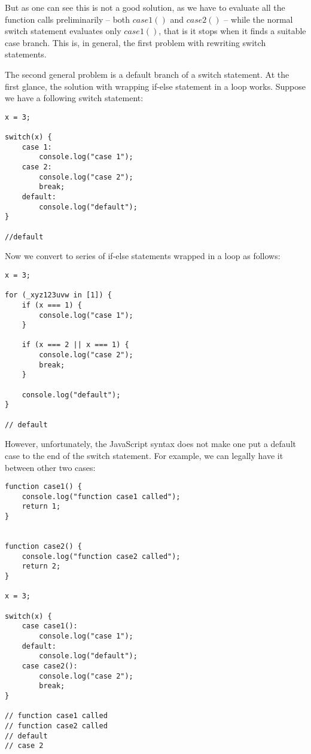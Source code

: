 \documentclass[a4paper]{article}
\begin{document}
But as one can see this is not a good solution, as we have to evaluate all the function calls preliminarily -- both $case1()$ and $case2()$ -- while the normal switch statement evaluates only $case1()$, that is it stops when it finds a suitable case branch. This is, in general, the first problem with rewriting switch statements.

The second general problem is a default branch of a switch statement. At the first glance, the solution with wrapping if-else statement in a loop works. Suppose we have a following switch statement:

\begin{lstlisting}
x = 3;

switch(x) {
    case 1: 
        console.log("case 1");
    case 2:
        console.log("case 2");	
        break;
    default: 
        console.log("default");
}

//default
\end{lstlisting} 

 Now we convert to series of if-else statements wrapped in a loop as follows:
 
\begin{lstlisting}
x = 3;

for (_xyz123uvw in [1]) {
    if (x === 1) { 
        console.log("case 1");
    }
	
    if (x === 2 || x === 1) {
        console.log("case 2");	
        break;
    }
	
    console.log("default");
}

// default
\end{lstlisting}
 
However, unfortunately, the JavaScript syntax does not make one put a default case to the end of the switch statement. For example, we can legally have it between other two cases:

\begin{lstlisting}
function case1() {
    console.log("function case1 called");
    return 1;
}


function case2() {
    console.log("function case2 called");
    return 2;
}

x = 3;

switch(x) {
	case case1(): 
		console.log("case 1");
	default: 
		console.log("default");
	case case2():
		console.log("case 2");	
		break;
}

// function case1 called
// function case2 called
// default
// case 2 
\end{lstlisting}
\end{document}
